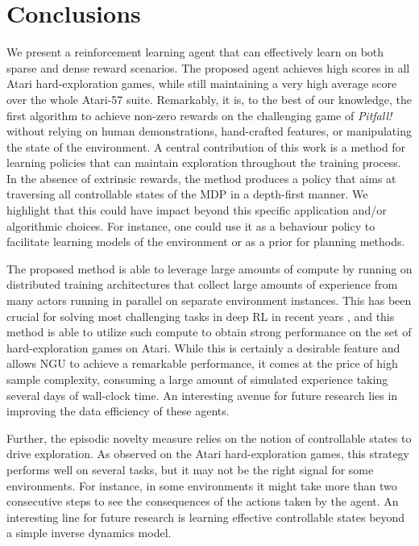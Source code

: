 \documentclass{article} \usepackage{iclr2020_conference,times}
\begin{document}
\section{Conclusions}
We present a reinforcement learning agent that can effectively learn on both sparse and dense reward scenarios.
The proposed agent achieves high scores in all Atari hard-exploration games, while still maintaining a very high average score over the whole Atari-57 suite. Remarkably, it is, to the best of our knowledge, the first algorithm to achieve non-zero rewards on the challenging game of \textit{Pitfall!} without relying on human demonstrations, hand-crafted features, or manipulating the state of the environment.
A central contribution of this work is a method for learning policies that can maintain exploration throughout the training process.
In the absence of extrinsic rewards, the method produces a policy that aims at traversing all controllable states of the MDP in a depth-first manner. We highlight that this could have impact beyond this specific application and/or algorithmic choices. For instance, one could use it as a behaviour policy to facilitate learning models of the environment or as a prior for planning methods.

The proposed method is able to leverage large amounts of compute by running on distributed training architectures that collect large amounts of experience from many actors running in parallel on separate environment instances. This has been crucial for solving most challenging tasks in deep RL in recent years \citep{andrychowicz2018learning, espeholt2018impala, silver2016mastering}, and this method is able to utilize such compute to obtain strong performance on the set of hard-exploration games on Atari.
While this is certainly a desirable feature and allows NGU to achieve a remarkable performance, it comes at the price of high sample
complexity, consuming a large amount of simulated experience taking several days of wall-clock time.
An interesting avenue for future research lies in improving the data efficiency of these agents.

Further, the episodic novelty measure relies on the notion of controllable states to drive exploration. As observed on the Atari hard-exploration games, this strategy performs well on several tasks, but it may not be the right signal for some environments. For instance, in some environments it might take more than two consecutive steps to see the consequences of the actions taken by the agent. An interesting line for future research is learning effective controllable states beyond a simple inverse dynamics model.
\end{document}

